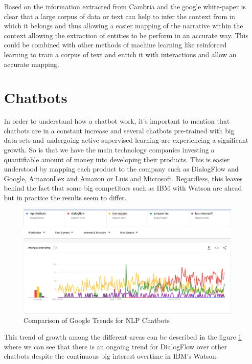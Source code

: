 Based on the information extracted from Cambria \cite{nlp_reference} and the google white-paper \cite{nlp_deep_google} is clear that a large corpus of data or text can help to infer the context from in which it belongs and thus allowing a easier mapping of the narrative within the context allowing the extraction of entities to be perform in an accurate way. This could be combined with other methods of machine learning like reinforced learning to train a corpus of text and enrich it with interactions and allow an accurate mapping.

\section{Chatbots}

In order to understand how a chatbot work, it's important to mention that chatbots are in a constant increase and several chatbots pre-trained with big data-sets and undergoing active supervised learning are experiencing a significant growth. So is that we have the main technology companies investing a quantifiable amount of money into developing their products. This is easier understood by mapping each product to the company such as DialogFlow and Google, AmazonLex and Amazon or Luis and Microsoft. Regardless, this leaves behind the fact that some big competitors such as IBM with Watson are ahead but in practice the results seem to differ.

\begin{figure}[h]
    \centering
    \includegraphics[scale=0.45]{MA-BA-Thesis/NLP_Chatbot_Comparison.png}
    \caption{Comparison of Google Trends for NLP Chatbots}
    \label{fig:nlp_chatbot_graph}
\end{figure}

This trend of growth among the different areas can be described in the figure \ref{fig:nlp_chatbot_graph} where we can see that there is an ongoing trend for DialogFlow over other chatbots despite the continuous big interest overtime in IBM's Watson.

